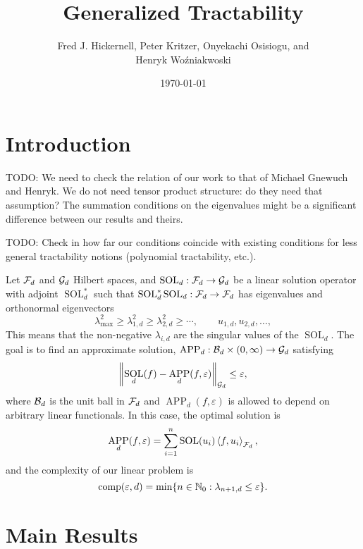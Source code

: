 \documentclass[11pt,a4paper]{article}
\DeclareMathOperator{\SOL}{SOL}
\DeclareMathOperator{\APP}{APP}
\newcommand{\fred}[1]{\begingroup\color{blue}#1\endgroup}
\newcommand{\peter}[1]{\begingroup\color{purple}#1\endgroup}
\newcommand{\kachi}[1]{\begingroup\color{ForestGreen}#1\endgroup}
\begin{document}
\newtheorem{theorem}{Theorem}
\theoremstyle{definition}
\newtheorem{definition}{Definition}


\title{Generalized Tractability}
\author{\fred{Fred J. Hickernell}, \peter{Peter Kritzer}, \kachi{Onyekachi Osisiogu}, and \\ Henryk Wo\'zniakwoski}
\date{\today}

\maketitle

\section{Introduction}

TODO: We need to check the relation of our work to that of Michael Gnewuch and Henryk. We do not need tensor product structure: do they need that assumption? The summation conditions on the eigenvalues might be a significant difference between our results and theirs.

\medskip

TODO: Check in how far our conditions coincide with existing conditions for less general tractability notions (polynomial tractability, etc.).

\medskip

Let $\mathcal{F}_d$ and $\mathcal{G}_d$ Hilbert spaces, and $\SOL_d : \cf_d \to \cg_d$ be a linear solution operator with adjoint $\SOL_d^*$ such that $\SOL_d^*\SOL_d : \cf_d \to \cf_d$ has eigenvalues and orthonormal eigenvectors
\[
\lambda_{\max}^2 \ge \lambda_{1,d}^2 \ge \lambda_{2,d}^2 \ge \cdots, \qquad u_{1,d}, u_{2,d}, \ldots,
\]
This means that the non-negative $\lambda_{i,d}$ are the singular values of the $\SOL_d$. The goal is to find an approximate solution, $\APP_d:\cb_d \times (0,\infty) \to \cg_d$ satisfying
\[
\norm[\cg_d]{\SOL_d(f) - \APP_d(f,\varepsilon)} \le \varepsilon,
\]
where $\mathcal{B}_d$ is the unit ball in $\mathcal{F}_d$ and $\APP_d(f,\varepsilon)$ is allowed to depend on arbitrary linear functionals.  In this case, the optimal solution is
\[
\APP_d(f,\varepsilon) = \sum_{i=1}^n \SOL(u_i) \ip[\cf_d]{f}{u_i},
\]
and the complexity of our linear problem is
\begin{equation}\label{eq:comp_def}
\operatorname{comp}(\varepsilon, d) = \min \{n \in \mathbb{N}_{0} : \lambda_{n+1, d} \le \varepsilon\}.
\end{equation}

\section{Main Results}
\end{document}
